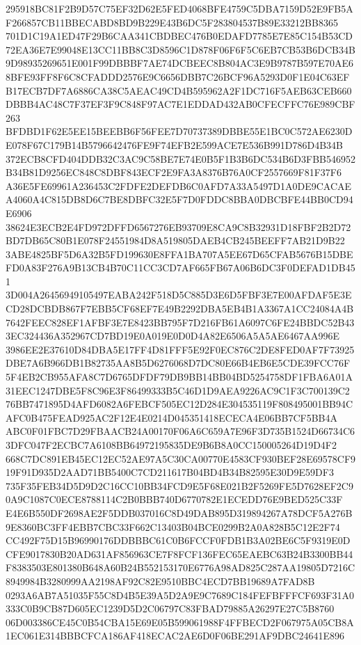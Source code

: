 \documentclass[UTF8,fontset=fandol,zihao=-4,a4paper]{ctexart}
\begin{document}
{{295918BC81F2B9D57C75EF32D62E5FED4068BFE4759C5DBA7159D52E9FB5AF266857CB11BBECABD8BD9B229E43B6DC5F283804537B89E33212BB8365
701D1C19A1ED47F29B6CAA341CBDBEC476B0EDAFD7785E7E85C154B53CD72EA36E7E99048E13CC11BB8C3D8596C1D878F06F6F5C6EB7CB53B6DCB34B
9D98935269651E001F99DBBBF7AE74DCBEEC8B804AC3E9B9787B597E70AE68BFE93FF8F6C8CFADDD2576E9C6656DBB7C26BCF96A5293D0F1E04C63EF
B17ECB7DF7A6886CA38C5AEAC49CD4B595962A2F1DC716F5AEB63CEB660DBBB4AC48C7F37EF3F9C848F97AC7E1EDDAD432AB0CFECFFC76E989CBF263
BFDBD1F62E5EE15BEEBB6F56FEE7D70737389DBBE55E1BC0C572AE6230DE078F67C179B14B5796642476FE9F74EFB2E599ACE7E536B991D786D4B34B
372ECB8CFD404DDB32C3AC9C58BE7E74E0B5F1B3B6DC534B6D3FBB546952B34B81D9256EC848C8DBF843ECF2E9FA3A8376B76A0CF2557669F81F37F6
A36E5FE69961A236453C2FDFE2DEFDB6C0AFD7A33A5497D1A0DE9CACAEA4060A4C815DB8D6C7BE8DBFC32E5F7D0FDDC8BBA0DBCBFE44BB0CD94E6906
38624E3ECB2E4FD972DFFD6567276EB93709E8CA9C8B32931D18FBF2B2D72BD7DB65C80B1E078F24551984D8A519805DAEB4CB245BEEFF7AB21D9B22
3ABE4825BF5D6A32B5FD199630E8FFA1BA707A5EE67D65CFAB5676B15DBEFD0A83F276A9B13CB4B70C11CC3CD7AF665FB67A06B6DC3F0DEFAD1DB451
3D004A26456949105497EABA242F518D5C885D3E6D5FBF3E7E00AFDAF5E3ECD28DCBDB867F7EBB5CF68EF7E49B2292DBA5EB4B1A3367A1CC24084A4B
7642FEEC828EF1AFBF3E7E8423BB795F7D216FB61A6097C6FE24BBDC52B433EC324436A352967CD7BD19E0A019E0D0D4A82E6506A5A5AE6467AA996E
3986EE2E37610D84DBA5E17FF4D81FFF5E92F0EC876C2DE8FED0AF7F73925DBE7A6B966DB1B82735AA8B5D6276068D7DC80E66B4EB6E5CDE39FCC76F
5F4EB2CB955AFA8C7D6765DFDF79DB9BB14BB04BD5254758DF1FBA6A01A31EEC1247DBE5F8C96E3F86499333B5C46D1D9AEA9226AC9C1F3C700139C2
76BB7471895D4AFD6082A6FEBCF505EC12D284E304535119F808495001BB94CAFC0B475FEAD925AC2F12E4E0214D045351418ECECA4E06BB7CF5BB4A
ABC0F01FBC7D29FBAACB24A00170F06A6C659A7E96F3D735B1524D66734C63DFC047F2ECBC7A6108BB64972195835DE9B6B8A0CC150005264D19D4F2
668C7DC891EB45EC12EC52AE97A5C30CA00770E4583CF930BEF28E69578CF919F91D935D2AAD71BB5400C7CD211617B04BD4B34B82595E30D9E59DF3
735F35FEB34D5D9D2C16CC10BB34FCD9E5F68E021B2F5269FE5D7628EF2C90A9C1087C0ECE8788114C2B0BBB740D6770782E1ECEDD76E9BED525C33F
E4E6B550DF2698AE2F5DDB037016C8D49DAB895D319894267A78DCF5A276B9E8360BC3FF4EBB7CBC33F662C13403B04BCE0299B2A0A828B5C12E2F74
CC492F75D15B96990176DDBBBC61C0B6FCCF0FDB1B3A02BE6C5F9319E0DCFE9017830B20AD631AF856963CE7F8FCF136FEC65EAEBC63B24B3300BB44
F8383503E801380B648A60B24B552153170E6776A98AD825C287AA19805D7216C8949984B3280999AA2198AF92C82E9510BBC4ECD7BB19689A7FAD8B
0293A6AB7A51035F55C8D4B5E39A5D2A9E9C7689C184FEFBFFFCF693F31A0333C0B9CB87D605EC1239D5D2C06797C83FBAD79885A26297E27C5B8760
06D003386CE45C0B54CBA15E69E05B599061988F4FFBECD2F067975A05CB8A1EC061E314BBBCFCA186AF418ECAC2AE6D0F06BE291AF9DBC24641E896
}}
\end{document}
